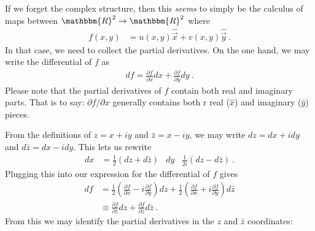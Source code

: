 If we forget the complex structure, then this \emph{seems} to simply be the calculus of maps between $\mathbbm{R}^2 \to \mathbbm{R}^2$ where
\begin{align}
	f(x,y) &= u(x,y) \hat{\vec{x}} + v(x,y)\hat{\vec{y}} \ .
\end{align}
In that case, we need to collect the partial derivatives. On the one hand, we may write the differential of $f$ as
\begin{align}
	df = \frac{\partial f}{\partial x} dx + \frac{\partial f}{\partial y} dy \ .
\end{align}
Please note that the partial derivatives of $f$ contain both real and imaginary parts. That is to say: $\partial f/\partial x$ generally contains both r real ($\hat x$) and imaginary ($\hat y$) pieces. 

From the definitions of $z=x+iy$ and $\bar z = x-iy$, we may write $dz = dx+idy$ and $d\bar z = dx-idy$. This lets us rewrite
\begin{align}
	dx &= \frac{1}{2}(dz+d\bar z)
	&
	dy & \frac{1}{2i}(dz-d\bar z) \ .
\end{align}
Plugging this into our expression for the differential of $f$ gives
\begin{align}
	df &= \frac{1}{2}
	\left(
		\frac{\partial f}{\partial x}
		-i\frac{\partial f}{\partial y}
	\right)dz
	+ 
	\frac{1}{2}
	\left(
		\frac{\partial f}{\partial x}
		+i\frac{\partial f}{\partial y}
	\right)d\bar z 
	\\
	&\equiv \frac{\partial f}{\partial z}dz
	+ \frac{\partial f}{\partial \bar z}d\bar z
	\label{eq:complex:2D:deviation}
	\ .
\end{align}
From this we may identify the partial derivatives in the $z$ and $\bar z$ coordinates:



